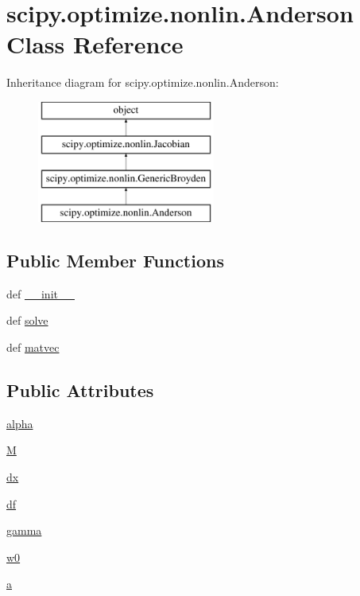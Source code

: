 \hypertarget{classscipy_1_1optimize_1_1nonlin_1_1Anderson}{}\section{scipy.\+optimize.\+nonlin.\+Anderson Class Reference}
\label{classscipy_1_1optimize_1_1nonlin_1_1Anderson}
Inheritance diagram for scipy.\+optimize.\+nonlin.\+Anderson\+:\begin{figure}[H]
\begin{center}
\leavevmode
\includegraphics[height=4.000000cm]{classscipy_1_1optimize_1_1nonlin_1_1Anderson}
\end{center}
\end{figure}
\subsection*{Public Member Functions}
\begin{DoxyCompactItemize}
\item 
def \hyperlink{classscipy_1_1optimize_1_1nonlin_1_1Anderson_a2dc5729c6f05f66826c648816e9d3d24}{\+\_\+\+\_\+init\+\_\+\+\_\+}
\item 
def \hyperlink{classscipy_1_1optimize_1_1nonlin_1_1Anderson_ad27c30380b7816ed7fe930268a5d2e23}{solve}
\item 
def \hyperlink{classscipy_1_1optimize_1_1nonlin_1_1Anderson_aefd4705d66b85077aa1a056fc7df7e7e}{matvec}
\end{DoxyCompactItemize}
\subsection*{Public Attributes}
\begin{DoxyCompactItemize}
\item 
\hyperlink{classscipy_1_1optimize_1_1nonlin_1_1Anderson_add45a5f8b60d85198f6e18e7695c742a}{alpha}
\item 
\hyperlink{classscipy_1_1optimize_1_1nonlin_1_1Anderson_aae98fea4449ce682b8b82c599c479410}{M}
\item 
\hyperlink{classscipy_1_1optimize_1_1nonlin_1_1Anderson_ab8ac98163a6abd460da9b477e660d743}{dx}
\item 
\hyperlink{classscipy_1_1optimize_1_1nonlin_1_1Anderson_a4968d29a1ed2a0e3e4b436a24fdc28c4}{df}
\item 
\hyperlink{classscipy_1_1optimize_1_1nonlin_1_1Anderson_a845b11b413d803e06c18a72d85d1c040}{gamma}
\item 
\hyperlink{classscipy_1_1optimize_1_1nonlin_1_1Anderson_ad4494abfd0d519f4551d625021a9f1ba}{w0}
\item 
\hyperlink{classscipy_1_1optimize_1_1nonlin_1_1Anderson_a3e23fb24b2dc67e1d1729809c6ef935a}{a}
\end{DoxyCompactItemize}


